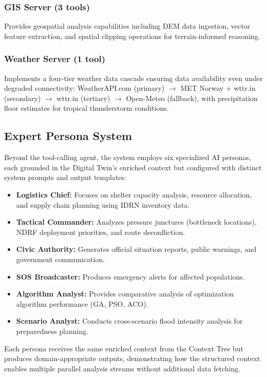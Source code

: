 \documentclass[journal]{IEEEtran}
\begin{document}
\subsubsection{GIS Server (3 tools)}
Provides geospatial analysis capabilities including DEM data ingestion,
vector feature extraction, and spatial clipping operations for
terrain-informed reasoning.

\subsubsection{Weather Server (1 tool)}
Implements a four-tier weather data cascade ensuring data availability
even under degraded connectivity: WeatherAPI.com (primary) $\to$ MET
Norway + wttr.in (secondary) $\to$ wttr.in (tertiary) $\to$ Open-Meteo
(fallback), with precipitation floor estimates for tropical thunderstorm
conditions.


\subsection{Expert Persona System}

Beyond the tool-calling agent, the system employs six specialized AI
personas, each grounded in the Digital Twin's enriched context but
configured with distinct system prompts and output templates:

\begin{itemize}[leftmargin=*]
    \item \textbf{Logistics Chief:} Focuses on shelter capacity analysis,
    resource allocation, and supply chain planning using IDRN inventory data.
    \item \textbf{Tactical Commander:} Analyzes pressure junctures
    (bottleneck locations), NDRF deployment priorities, and route
    deconfliction.
    \item \textbf{Civic Authority:} Generates official situation reports,
    public warnings, and government communication.
    \item \textbf{SOS Broadcaster:} Produces emergency alerts for affected
    populations.
    \item \textbf{Algorithm Analyst:} Provides comparative analysis of
    optimization algorithm performance (GA, PSO, ACO).
    \item \textbf{Scenario Analyst:} Conducts cross-scenario flood intensity
    analysis for preparedness planning.
\end{itemize}

Each persona receives the same enriched context from the Context Tree but
produces domain-appropriate outputs, demonstrating how the structured context
enables multiple parallel analysis streams without additional data fetching.
\end{document}
